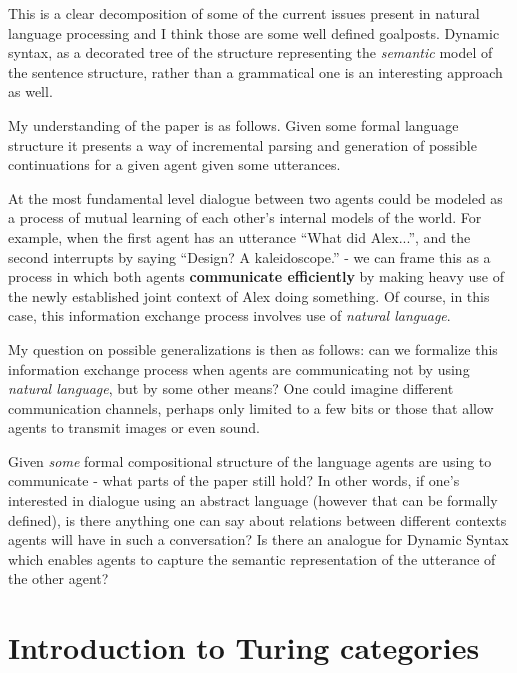 \documentclass{amsart}
\begin{document}
This is a clear decomposition of some of the current issues present in natural
language processing and I think those are some well defined goalposts.
Dynamic syntax, as a decorated tree of the structure representing the
\textit{semantic} model of the sentence structure, rather than a grammatical one
is an interesting approach as well.

My understanding of the paper is as follows. Given some formal language structure it
presents a way of incremental parsing and generation of possible continuations
for a given agent given some utterances.

At the most fundamental level dialogue between two agents could be modeled as a
process of mutual learning of each other's internal models of the world. For example, when
the first agent has an utterance ``What did Alex...'', and the second interrupts by
saying ``Design? A kaleidoscope.'' - we can frame this as a process in which both agents
\textbf{communicate efficiently} by making heavy use of the newly established
joint context of Alex doing something. Of course, in this case, this information exchange
process involves use of \textit{natural language}.

My question on possible generalizations is then as follows: can we formalize
this information exchange process when agents are communicating not by using
\textit{natural language}, but by some other means? One could imagine different
communication channels, perhaps only limited to a few bits or those that allow
agents to transmit images or even sound.

Given \textit{some} formal compositional structure of the language agents are
using to communicate - what parts of the paper still hold? In other words, if
one's interested in dialogue using an abstract language (however that can be
formally defined), is there anything one can say about relations between
different contexts agents will have in such a conversation?
Is there an analogue for Dynamic Syntax which enables agents to capture the semantic
representation of the utterance of the other agent?





\section{Introduction to Turing categories}
\label{sec:intro-turing}
\end{document}
